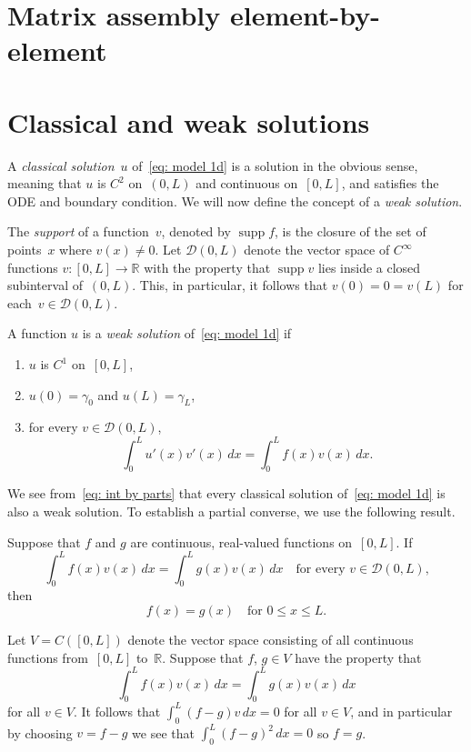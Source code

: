 \section{Matrix assembly element-by-element}


\section{Classical and weak solutions}
A \emph{classical solution}~$u$ of~\eqref{eq: model 1d} is a solution in the 
obvious sense, meaning that $u$ is $C^2$ on~$(0,L)$ and continuous on~$[0,L]$,
and satisfies the ODE and boundary condition.  We will now define the concept 
of a \emph{weak solution}.

The \emph{support} of a function~$v$, denoted by $\operatorname{supp}f$, is 
the closure of the set of points~$x$ where $v(x)\ne0$. Let $\mathcal{D}(0,L)$ 
denote the vector space of $C^\infty$ functions $v:[0,L]\to\mathbb{R}$ with the 
property that $\operatorname{supp}v$ lies inside a closed subinterval 
of~$(0,L)$.  This, in particular,
it follows that $v(0)=0=v(L)$ for each~$v\in\mathcal{D}(0,L)$.

\begin{definition}
A function $u$ is a \emph{weak solution} of~\eqref{eq: model 1d} if 
\begin{enumerate}
\item $u$ is $C^1$ on~$[0,L]$,
\item $u(0)=\gamma_0$ and $u(L)=\gamma_L$,
\item for every $v\in\mathcal{D}(0,L)$,
\[
\int_0^L u'(x)v'(x)\,dx=\int_0^Lf(x)v(x)\,dx.
\]
\end{enumerate}
\end{definition}

We see from~\eqref{eq: int by parts} that every classical solution 
of~\eqref{eq: model 1d} is also a weak solution.  To establish a partial 
converse, we use the following result.

\begin{lemma}
Suppose that $f$ and $g$ are continuous, real-valued functions on~$[0,L]$.
If
\[
\int_0^L f(x)v(x)\,dx=\int_0^L g(x)v(x)\,dx
	\quad\text{for every $v\in\mathcal{D}(0,L)$,}
\]
then 
\[
f(x)=g(x)\quad\text{for $0\le x\le L$.}
\]
\end{lemma}

Let $V=C([0,L])$ denote the vector space consisting of all continuous functions 
from~$[0,L]$ to~$\mathbb{R}$.  Suppose that $f$, $g\in V$ have the property that
\begin{equation}\label{eq: int fv gv}
\int_0^Lf(x)v(x)\,dx=\int_0^Lg(x)v(x)\,dx
\end{equation}
for all $v\in V$. It follows that $\int_0^L(f-g)v\,dx=0$ for all $v\in V$, and 
in particular by choosing $v=f-g$ we see that $\int_0^L(f-g)^2\,dx=0$ so $f=g$.

